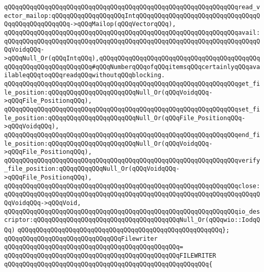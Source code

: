 \verb|qQQqqQQqqQQqqQQqqQQqqQQqqQQqqQQqqQQqqQQqqQQqqQQqqQQqqQQqqQQqqQQqread_vector_mailop:qQQqqQQqqQQqqQQqqQQqIntqQQqqQQqqQQqqQQqqQQqqQQqqQQqqQQqqQQqqQQqqQQqqQQqqQQq->qQQqMailop(qQQqVectorqQQq),|\newline
\newline
\verb|qQQqqQQqqQQqqQQqqQQqqQQqqQQqqQQqqQQqqQQqqQQqqQQqqQQqqQQqqQQqqQQqavail:qQQqqQQqqQQqqQQqqQQqqQQqqQQqqQQqqQQqqQQqqQQqqQQqqQQqqQQqqQQqqQQqqQQqqQQqVoidqQQq->qQQqNull_Or(qQQqIntqQQq),qQQqqQQqqQQqqQQqqQQqqQQqqQQqqQQqqQQqqQQqqQQqqQQqqQQqqQQqqQQqqQQqqQQq#qQQqNumberqQQqofqQQqitemsqQQqcertainlyqQQqavailableqQQqtoqQQqreadqQQqwithoutqQQqblocking.|\newline
\newline
\verb|qQQqqQQqqQQqqQQqqQQqqQQqqQQqqQQqqQQqqQQqqQQqqQQqqQQqqQQqqQQqqQQqget_file_position:qQQqqQQqqQQqqQQqqQQqqQQqNull_Or(qQQqVoidqQQq->qQQqFile_PositionqQQq),|\newline
\verb|qQQqqQQqqQQqqQQqqQQqqQQqqQQqqQQqqQQqqQQqqQQqqQQqqQQqqQQqqQQqqQQqset_file_position:qQQqqQQqqQQqqQQqqQQqqQQqNull_Or(qQQqFile_PositionqQQq->qQQqVoidqQQq),|\newline
\newline
\verb|qQQqqQQqqQQqqQQqqQQqqQQqqQQqqQQqqQQqqQQqqQQqqQQqqQQqqQQqqQQqqQQqend_file_position:qQQqqQQqqQQqqQQqqQQqqQQqNull_Or(qQQqVoidqQQq->qQQqFile_PositionqQQq),|\newline
\verb|qQQqqQQqqQQqqQQqqQQqqQQqqQQqqQQqqQQqqQQqqQQqqQQqqQQqqQQqqQQqqQQqverify_file_position:qQQqqQQqqQQqNull_Or(qQQqVoidqQQq->qQQqFile_PositionqQQq),|\newline
\newline
\verb|qQQqqQQqqQQqqQQqqQQqqQQqqQQqqQQqqQQqqQQqqQQqqQQqqQQqqQQqqQQqqQQqclose:qQQqqQQqqQQqqQQqqQQqqQQqqQQqqQQqqQQqqQQqqQQqqQQqqQQqqQQqqQQqqQQqqQQqqQQqVoidqQQq->qQQqVoid,|\newline
\verb|qQQqqQQqqQQqqQQqqQQqqQQqqQQqqQQqqQQqqQQqqQQqqQQqqQQqqQQqqQQqqQQqio_descriptor:qQQqqQQqqQQqqQQqqQQqqQQqqQQqqQQqqQQqqQQqNull_Or(qQQqwio::IodqQQq)|\newline
\verb|qQQqqQQqqQQqqQQqqQQqqQQqqQQqqQQqqQQqqQQqqQQqqQQqqQQqqQQq};|\newline
\newline
\verb|qQQqqQQqqQQqqQQqqQQqqQQqqQQqqQQqFilewriter|\newline
\verb|qQQqqQQqqQQqqQQqqQQqqQQqqQQqqQQqqQQqqQQqqQQqqQQq=|\newline
\verb|qQQqqQQqqQQqqQQqqQQqqQQqqQQqqQQqqQQqqQQqqQQqqQQqFILEWRITER|\newline
\verb|qQQqqQQqqQQqqQQqqQQqqQQqqQQqqQQqqQQqqQQqqQQqqQQqqQQqqQQq{|\newline
